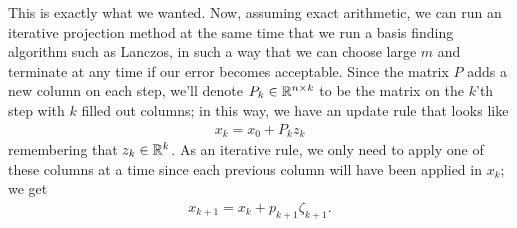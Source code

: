 \documentclass[11pt]{article}
\begin{document}
This is exactly what we wanted. Now, assuming exact arithmetic, we can run an iterative projection method at the same time that we run a basis finding algorithm such as Lanczos, in such a way that we can choose large $m$ and terminate at any time if our error becomes acceptable. Since the matrix $P$ adds a new column on each step, we'll denote $P_k \in \mathbb{R}^{n \times k}$ to be the matrix on the $k$'th step with $k$ filled out columns; in this way, we have an update rule that looks like \begin{gather*}
x_k = x_0 + P_k z_k
\end{gather*}
remembering that $z_k \in \mathbb{R}^k$. As an iterative rule, we only need to apply one of these columns at a time since each previous column will have been applied in $x_k$; we get \begin{gather*}
x_{k+1} = x_k + p_{k+1} \zeta_{k+1}.
\end{gather*}
\end{document}
